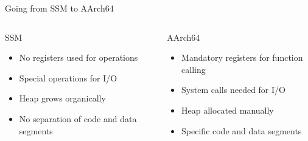 \documentclass[department=icis, slidenumbers=slide, official=true]{beamerruhuisstijl}
\begin{document}
\begin{frame}{Going from SSM to AArch64}
    \begin{columns}
        \begin{block}{SSM}
            \begin{itemize}
                \item No registers used for operations
                \item Special operations for I/O
                \item Heap grows organically
                \item No separation of code and data segments
            \end{itemize}
        \end{block}
        \begin{block}{AArch64}
            \begin{itemize}
                \item Mandatory registers for function calling
                \item System calls needed for I/O
                \item Heap allocated manually
                \item Specific code and data segments
            \end{itemize}
        \end{block}
    \end{columns}
\end{frame}
\end{document}
